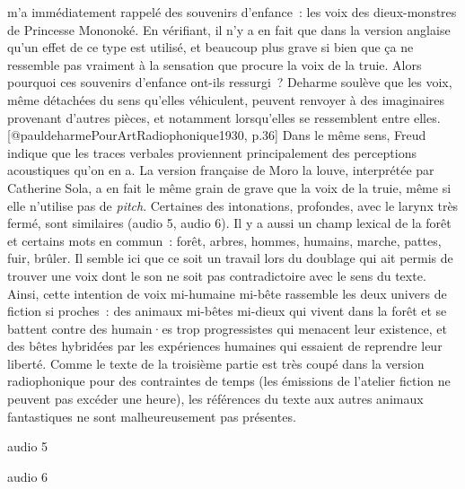 \documentclass[
]{article}
\begin{document}
m'a immédiatement rappelé des souvenirs d'enfance~: les voix des dieux-monstres de Princesse Mononoké. En vérifiant, il n'y a en fait que dans la version anglaise qu'un effet de ce type est utilisé, et beaucoup plus grave si bien que ça ne ressemble pas vraiment à la sensation que procure la voix de la truie. Alors pourquoi ces souvenirs d'enfance ont-ils ressurgi~? Deharme soulève que les voix, même détachées du sens qu'elles véhiculent, peuvent renvoyer à des imaginaires provenant d'autres pièces, et notamment lorsqu'elles se ressemblent entre elles.{[}@pauldeharmePourArtRadiophonique1930, p.36{]} Dans le même sens, Freud indique que les traces verbales proviennent principalement des perceptions acoustiques qu'on en a. La version française de Moro la louve, interprétée par Catherine Sola, a en fait le même grain de grave que la voix de la truie, même si elle n'utilise pas de \emph{pitch}. Certaines des intonations, profondes, avec le larynx très fermé, sont similaires (audio 5, audio 6). Il y a aussi un champ lexical de la forêt et certains mots en commun~: forêt, arbres, hommes, humains, marche, pattes, fuir, brûler. Il semble ici que ce soit un travail lors du doublage qui ait permis de trouver une voix dont le son ne soit pas contradictoire avec le sens du texte. Ainsi, cette intention de voix mi-humaine mi-bête rassemble les deux univers de fiction si proches~: des animaux mi-bêtes mi-dieux qui vivent dans la forêt et se battent contre des humain·es trop progressistes qui menacent leur existence, et des bêtes hybridées par les expériences humaines qui essaient de reprendre leur liberté. Comme le texte de la troisième partie est très coupé dans la version radiophonique pour des contraintes de temps (les émissions de l'atelier fiction ne peuvent pas excéder une heure), les références du texte aux autres animaux fantastiques ne sont malheureusement pas présentes.

audio 5

\label{audio-5}

audio 6

\label{audio-6}
\end{document}
